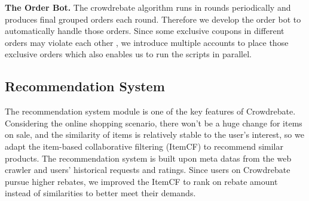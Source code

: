 \textbf{The Order Bot.} The crowdrebate algorithm runs in rounds periodically and produces final grouped orders each round. Therefore we develop the order bot to automatically handle those orders. Since some exclusive coupons in different orders may violate each other , we introduce multiple accounts to place  those exclusive orders which also enables us to run the scripts in parallel.

\subsection{Recommendation System}

The recommendation system module is one of the key features of Crowdrebate. Considering the online shopping scenario, there won't be a huge change for items on sale, and the similarity of items is relatively stable to the user’s interest, so we adapt the item-based collaborative filtering (ItemCF) to recommend similar products. The recommendation system is built upon meta datas from the web crawler and users' historical requests and ratings. Since users on Crowdrebate pursue higher rebates, we improved the ItemCF to rank on rebate amount instead of similarities to better meet their demands. 